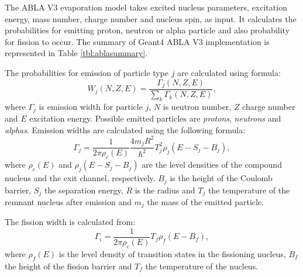 The ABLA V3 evaporation model takes excited nucleus parameters,
excitation energy, mass number, charge number and nucleus spin, as
input. It calculates the probabilities for emitting proton, neutron or
alpha particle and also probability for fission to occur. 
The summary of Geant4 ABLA V3 implementation is represented in Table \ref{tbl:ablasummary}.


The probabilities for emission of particle type $j$ are calculated using
formula:
\begin{equation}
W_j(N,Z,E) = \frac{\Gamma_j(N,Z,E)}{\sum_k\Gamma_k(N,Z,E)},
\label{eqn:probabilities}
\end{equation}
where $\Gamma_j$ is emission width for particle $j$, $N$ is neutron
number, $Z$ charge number and $E$ excitation energy. Possible emitted
particles are \emph{protons}, \emph{neutrons} and \emph{alphas}.
Emission widths are calculated using the following formula:
\begin{equation}
\Gamma_j = \frac{1}{2 \pi \rho_c(E)} \frac{4 m_j R^2}{\hbar^2} T_j^2 \rho_j(E - S_j - B_j),
\label{eqn:emissionwidth}
\end{equation}
where $\rho_c(E)$ and $\rho_j(E - S_j - B_j)$ are the level densities
of the compound nucleus and the exit channel, respectively. $B_j$ is
the height of the Coulomb barrier, $S_j$ the separation energy, $R$ is
the radius and $T_j$ the temperature of the remnant nucleus after
emission and $m_j$ the mass of the emitted particle.

The fission width is calculated from:
\begin{equation}
\Gamma_i = \frac{1}{2 \pi \rho_c(E)}T_f \rho_f(E - B_f),
\label{eqn:fissionwidth}
\end{equation}
where $\rho_f(E)$ is the level density of transition states in the
fissioning nucleus, $B_f$ the height of the fission barrier and $T_f$
the temperature of the nucleus.



